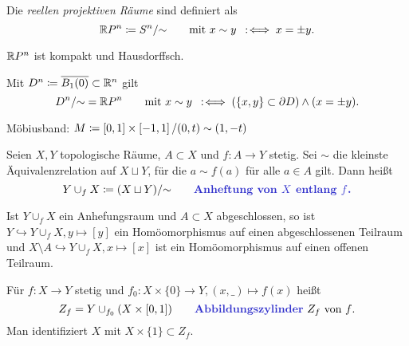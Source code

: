 \documentclass{cheat-sheet}
\begin{document}

\begin{defn}
  Die \emph{reellen projektiven Räume} sind definiert als
  \[ \mathbb{R} P^n \coloneqq S^n/{\sim} \qquad \text{mit } x \sim y \enspace:\!\iff x = \pm y. \]
\end{defn}

\begin{prop}
  $\mathbb{R} P^n$ ist kompakt und Hausdorffsch.
\end{prop}

\begin{bem}
  Mit $D^n \coloneqq \overline{B_1(0)} \subset \mathbb{R}^n$ gilt
  \[ D^n / {\sim} = \mathbb{R} P^n \qquad \text{mit } x \sim y \enspace:\!\iff (\{ x, y \} \subset \partial D) \wedge (x = \pm y). \]
\end{bem}


\begin{bsp}
  Möbiusband: $M \coloneqq \left[ 0, 1 \right] \times \left[ -1, 1 \right] / (0, t) \sim (1, -t)$
\end{bsp}


\begin{defn}
  Seien $X, Y$ topologische Räume, $A \subset X$ und $f : A \to Y$ stetig. Sei ${\sim}$ die kleinste Äquivalenzrelation auf $X \sqcup Y$, für die $a \sim f(a)$ für alle $a \in A$ gilt. Dann heißt
  \[
    Y \cup_f X \coloneqq (X \sqcup Y) / {\sim}
    \qquad \text{\emph{Anheftung von $X$ entlang $f$.}}
  \]
\end{defn}

\begin{prop}
  Ist $Y \cup_f X$ ein Anhefungsraum und $A \subset X$ abgeschlossen, so ist $Y \hookrightarrow Y \cup_f X, y \mapsto [y]$ ein Homöomorphismus auf einen abgeschlossenen Teilraum und $X \setminus A \hookrightarrow Y \cup_f X, x \mapsto [x]$ ist ein Homöomorphismus auf einen offenen Teilraum.
\end{prop}

\begin{defn}
  Für $f : X \to Y$ stetig und $f_0 : X \times \{ 0 \} \to Y, (x, \_) \mapsto f(x)$ heißt
  \[
    Z_f = Y \cup_{f_0} (X \times \I)
    \qquad \text{\emph{Abbildungszylinder} $Z_f$ von $f$.}
  \]
  Man identifiziert $X$ mit $X \times \{ 1 \} \subset Z_f$.
\end{defn}
\end{document}
